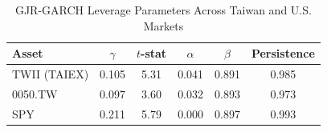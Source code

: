 \begin{table}[H]
\centering
\caption{GJR-GARCH Leverage Parameters Across Taiwan and U.S. Markets}
\label{tab:gamma}
\begin{tabular}{lccccc}
\toprule
Asset & $\gamma$ & $t$-stat & $\alpha$ & $\beta$ & Persistence \\
\midrule
TWII (TAIEX) & 0.105 & 5.31 & 0.041 & 0.891 & 0.985 \\
0050.TW & 0.097 & 3.60 & 0.032 & 0.893 & 0.973 \\
SPY & 0.211 & 5.79 & 0.000 & 0.897 & 0.993 \\
\midrule
%
%
%

\end{tabular}
\end{table}

